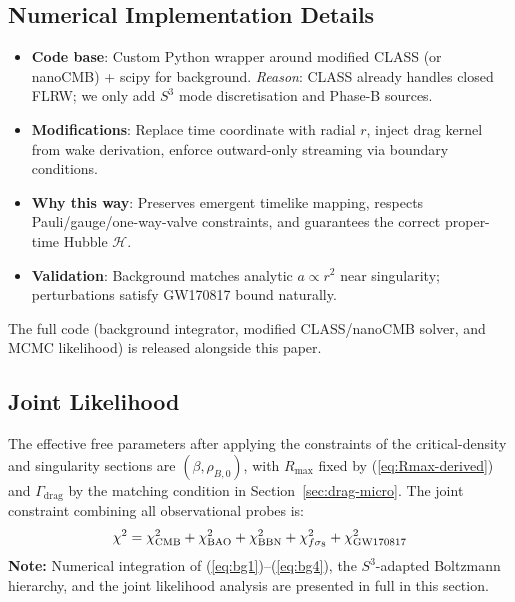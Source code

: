 \documentclass[10pt,twocolumn]{article}
\theoremstyle{definition}
\newcommand{\Rmax}{R_{\max}}
\newcommand{\Hcal}{\mathcal{H}}
\newcommand{\Gammadrag}{\Gamma_{\mathrm{drag}}}
\begin{document}
\subsection{Numerical Implementation Details}
\begin{itemize}
\item \textbf{Code base}: Custom Python wrapper around modified
  CLASS (or nanoCMB) + scipy for background.  
  \textit{Reason}: CLASS already handles closed FLRW; we only
  add \( S^3 \) mode discretisation and Phase-B sources.
\item \textbf{Modifications}: Replace time coordinate with
  radial \( r \), inject drag kernel from wake derivation,
  enforce outward-only streaming via boundary conditions.
\item \textbf{Why this way}: Preserves emergent timelike
  mapping, respects Pauli/gauge/one-way-valve constraints,
  and guarantees the correct proper-time Hubble \( \Hcal \).
\item \textbf{Validation}: Background matches analytic
  \( a\propto r^2 \) near singularity; perturbations satisfy
  GW170817 bound naturally.
\end{itemize}

The full code (background integrator, modified CLASS/nanoCMB solver, and MCMC likelihood) is released alongside this paper.



\subsection{Joint Likelihood}

The effective free parameters after applying the
constraints of the critical-density and singularity sections
are \( (\beta,\rho_{B,0}) \),
with \( \Rmax \) fixed by (\ref{eq:Rmax-derived}) and
\( \Gammadrag \) by the matching condition in Section~\ref{sec:drag-micro}.
The joint constraint combining all observational probes is:
\begin{equation}
  \chi^{2} = \chi^{2}_{\rm CMB} + \chi^{2}_{\rm BAO} + \chi^{2}_{\rm BBN} + \chi^{2}_{f\sigma_{8}} + \chi^{2}_{\rm GW170817}
  \label{eq:joint-constraint}
\end{equation}
\noindent
\textbf{Note:} Numerical integration of (\ref{eq:bg1})--(\ref{eq:bg4}),
the \(S^3\)-adapted Boltzmann hierarchy, and the joint likelihood analysis are presented in full in this section.
\end{document}
